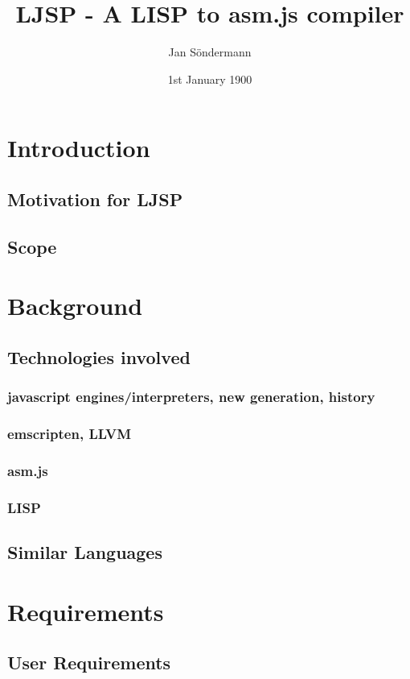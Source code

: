 \documentclass[11pt]{report}
\title{LJSP - A LISP to asm.js compiler}
\author{Jan S\"ondermann}
\date{1st January 1900}
\begin{document}
\maketitle


\tableofcontents

\chapter{Introduction}
\section{Motivation for LJSP}
\section{Scope}

\chapter{Background}
\section{Technologies involved}
\subsection{javascript engines/interpreters, new generation, history}
\subsection{emscripten, LLVM}
\subsection{asm.js}
\subsection{LISP}
\section{Similar Languages}

\chapter{Requirements}
\section{User Requirements}
\end{document}
